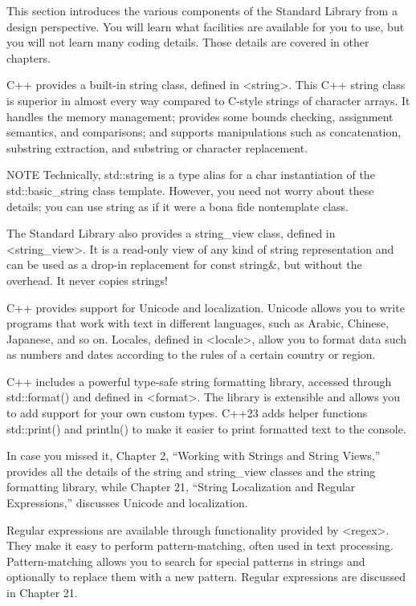 
This section introduces the various components of the Standard Library from a design perspective.
You will learn what facilities are available for you to use, but you will not learn many coding details. Those details are covered in other chapters.


C++ provides a built-in string class, defined in <string>. This C++ string class is superior in almost every way compared to C-style strings of character arrays. It handles the memory management; provides some bounds checking, assignment semantics, and comparisons; and supports manipulations such as concatenation, substring extraction, and substring or character replacement.

\begin{myNotic}{NOTE}
Technically, std::string is a type alias for a char instantiation of the std::basic\_string class template. However, you need not worry about these details; you can use string as if it were a bona fide nontemplate class.
\end{myNotic}

The Standard Library also provides a string\_view class, defined in <string\_view>. It is a read-only view of any kind of string representation and can be used as a drop-in replacement for const string\&, but without the overhead. It never copies strings!

C++ provides support for Unicode and localization. Unicode allows you to write programs that work with text in different languages, such as Arabic, Chinese, Japanese, and so on. Locales, defined in <locale>, allow you to format data such as numbers and dates according to the rules of a certain country or region.

C++ includes a powerful type-safe string formatting library, accessed through std::format() and defined in <format>. The library is extensible and allows you to add support for your own custom types. C++23 adds helper functions std::print() and println() to make it easier to print formatted text to the console.

In case you missed it, Chapter 2, “Working with Strings and String Views,” provides all the details of the string and string\_view classes and the string formatting library, while Chapter 21, “String Localization and Regular Expressions,” discusses Unicode and localization.


Regular expressions are available through functionality provided by <regex>. They make it easy to perform pattern-matching, often used in text processing. Pattern-matching allows you to search for special patterns in strings and optionally to replace them with a new pattern. Regular expressions are discussed in Chapter 21.

